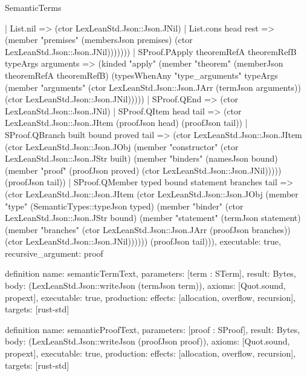 \begin{lexlean}{SemanticTerms}
\begin{semanticmodule}
{      | List.nil => (ctor LexLeanStd.Json::Json.JNil)
      | List.cons head rest => (member "premises" (membersJson premises) (ctor LexLeanStd.Json::Json.JNil)))))))
    | SProof.PApply theoremRefA theoremRefB typeArgs arguments => (kinded "apply" (member "theorem" (memberJson theoremRefA theoremRefB) (typesWhenAny "type_arguments" typeArgs (member "arguments" (ctor LexLeanStd.Json::Json.JArr (termJson arguments)) (ctor LexLeanStd.Json::Json.JNil)))))
    | SProof.QEnd => (ctor LexLeanStd.Json::Json.JNil)
    | SProof.QItem head tail => (ctor LexLeanStd.Json::Json.JItem (proofJson head) (proofJson tail))
    | SProof.QBranch built bound proved tail => (ctor LexLeanStd.Json::Json.JItem (ctor LexLeanStd.Json::Json.JObj (member "constructor" (ctor LexLeanStd.Json::Json.JStr built) (member "binders" (namesJson bound) (member "proof" (proofJson proved) (ctor LexLeanStd.Json::Json.JNil))))) (proofJson tail))
    | SProof.QMember typed bound statement branches tail => (ctor LexLeanStd.Json::Json.JItem (ctor LexLeanStd.Json::Json.JObj (member "type" (SemanticTypes::typeJson typed) (member "binder" (ctor LexLeanStd.Json::Json.JStr bound) (member "statement" (termJson statement) (member "branches" (ctor LexLeanStd.Json::Json.JArr (proofJson branches)) (ctor LexLeanStd.Json::Json.JNil)))))) (proofJson tail))),
  executable: true,
  recursive_argument: proof
}

definition{
  name: semanticTermText,
  parameters: [term : STerm],
  result: Bytes,
  body: (LexLeanStd.Json::writeJson (termJson term)),
  axioms: [Quot.sound, propext],
  executable: true,
  production: {effects: [allocation, overflow, recursion], targets: [rust-std]}
}

definition{
  name: semanticProofText,
  parameters: [proof : SProof],
  result: Bytes,
  body: (LexLeanStd.Json::writeJson (proofJson proof)),
  axioms: [Quot.sound, propext],
  executable: true,
  production: {effects: [allocation, overflow, recursion], targets: [rust-std]}
}
\end{semanticmodule}
\end{lexlean}
